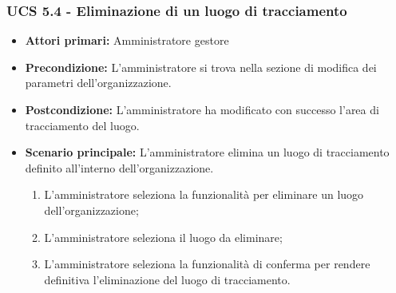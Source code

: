 \subsubsection{UCS 5.4 - Eliminazione di un luogo di tracciamento}%
\begin{itemize}
    \item \textbf{Attori primari:} Amministratore gestore
    \item \textbf{Precondizione:} L'amministratore si trova nella sezione di modifica dei parametri dell'organizzazione.
    \item \textbf{Postcondizione:} L'amministratore ha modificato con successo l'area di tracciamento del luogo.
    \item \textbf{Scenario principale:} L'amministratore elimina un luogo di tracciamento definito all'interno dell'organizzazione.
    \begin{enumerate}%
        \item L'amministratore seleziona la funzionalità per eliminare un luogo dell'organizzazione;
        \item L'amministratore seleziona il luogo da eliminare;
        \item L'amministratore seleziona la funzionalità di conferma per rendere definitiva l'eliminazione del luogo di tracciamento.
    \end{enumerate}
\end{itemize}

